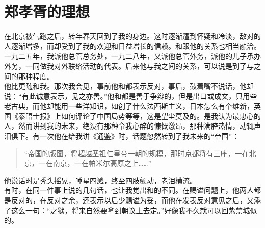 \fancyhead[RO]{} %
\fancyhead[LE]{} %
\chapter*{郑孝胥的理想}
\thispagestyle{empty}
在北京被气跑之后，转年春天回到了我的身边。这时逐渐遭到怀疑和冷淡，敌对的人逐渐增多，而却受到了我的欢迎和日益增长的信赖。和跟他的关系也相当融洽。一九二五年，我派他总管总务处，一九二八年，又派他总管外务，派他的儿子承办外务，一同做我对外联络活动的代表。后来他与我之间的关系，可以说是到了与之间的那种程度。\\

他比更随和我。那次我会见，事前他和都表示反对，事后，鼓着嘴不说话，他却说：“有此诚意表示，见之亦善。”他和都是善于争辩的，但是出口或成文，只用些老古典，而他却能用一些洋知识，如创了什么法西斯主义，日本怎么有个维新，英国《泰晤士报》上如何评论了中国局势等等，这是望尘莫及的。是我认为最忠心的人，然而讲到我的未来，绝没有那种令我心醉的慷慨激昂，那种满腔热情，动辄声泪俱下。有一次他在给我讲《通鉴》时，话题忽然转到了我未来的“帝国”：\\

\begin{quote}
	“帝国的版图，将超越圣祖仁皇帝一朝的规模，那时京都将有三座，一在北京，一在南京，一在帕米尔高原之上……”\\
\end{quote}

他说话时是秃头摇晃，唾星四溅，终至四肢颤动，老泪横流。\\

有时，在同一件事上说的几句话，也让我觉出和的不同。在赐谥问题上，他两人都是反对的，在反对之余，还表示以后少赐谥为妥，而他在发表反对意见之后，又添了这么一句：“之狱，将来自然要拿到朝议上去定。”好像我不久就可以回紫禁城似的。\\


